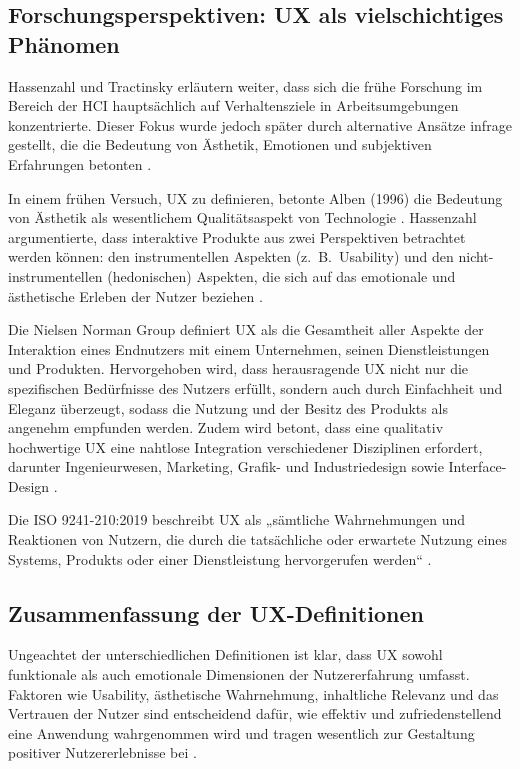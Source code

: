 \documentclass[12pt,oneside]{article}
\begin{document}
\subsection{Forschungsperspektiven: UX als vielschichtiges Phänomen}

Hassenzahl und Tractinsky erläutern weiter, dass sich die frühe Forschung im Bereich der HCI hauptsächlich auf Verhaltensziele in Arbeitsumgebungen konzentrierte. Dieser Fokus wurde jedoch später durch alternative Ansätze infrage gestellt, die die Bedeutung von Ästhetik, Emotionen und subjektiven Erfahrungen betonten \cite{research}.

In einem frühen Versuch, UX zu definieren, betonte Alben (1996) die Bedeutung von Ästhetik als wesentlichem Qualitätsaspekt von Technologie \cite{research}. Hassenzahl argumentierte, dass interaktive Produkte aus zwei Perspektiven betrachtet werden können: den instrumentellen Aspekten (z.~B.\ Usability)
 und den nicht-instrumentellen (hedonischen) Aspekten, die sich auf das emotionale und ästhetische Erleben der Nutzer beziehen \cite{hassenzahl2003}.

Die Nielsen Norman Group definiert UX als die Gesamtheit aller Aspekte der Interaktion eines Endnutzers mit einem Unternehmen, seinen Dienstleistungen und Produkten. Hervorgehoben wird, dass herausragende UX nicht nur die spezifischen Bedürfnisse des Nutzers erfüllt, sondern auch durch Einfachheit und Eleganz überzeugt, sodass die Nutzung und der Besitz des Produkts als angenehm empfunden werden. Zudem wird betont, dass eine qualitativ hochwertige UX eine nahtlose Integration verschiedener Disziplinen erfordert, darunter Ingenieurwesen, Marketing, Grafik- und Industriedesign sowie Interface-Design \cite{nngroup}.

Die ISO 9241-210:2019 beschreibt UX als „sämtliche Wahrnehmungen und Reaktionen von Nutzern, die durch die tatsächliche oder erwartete Nutzung eines Systems, Produkts oder einer Dienstleistung hervorgerufen werden“ \cite{ISO}.

\subsection{Zusammenfassung der UX-Definitionen}

Ungeachtet der unterschiedlichen Definitionen ist klar, dass UX sowohl funktionale als auch emotionale Dimensionen der Nutzererfahrung umfasst. Faktoren wie Usability, ästhetische Wahrnehmung, inhaltliche Relevanz und das Vertrauen der Nutzer sind entscheidend dafür, wie effektiv und zufriedenstellend eine Anwendung wahrgenommen wird und tragen wesentlich zur Gestaltung positiver Nutzererlebnisse bei \cite{toolbox}.
\end{document}
